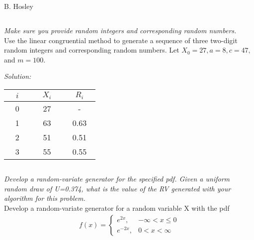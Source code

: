 \documentclass[12pt]{amsart}
\begin{document}
\raggedbottom

\hspace{\fill} {\large B. Hosley}
\bigskip


\setcounter{section}{7}
\setcounter{subsection}{3}
\subsection{} 
	\textit{Make sure you provide random integers and corresponding random numbers.} \\
	Use the linear congruential method to generate a sequence of three two-digit random integers and corresponding random numbers. Let \(X_0 = 27, a = 8, c = 47,\) and \(m = 100\).

\bigskip
	\textit{Solution:} \\ 
	\phantom{text}\hspace{10ex}\phantom{text}
	\begin{tabular}{c|c|c}
		$\quad i\quad$ & $\quad X_i\quad$ & $\quad R_i\quad$ \\
		\midrule
		0 & 27 & - \\
		1 & 63 & 0.63 \\
		2 & 51 & 0.51 \\
		3 & 55 & 0.55 \\
	\end{tabular}
	
\bigskip
	
\setcounter{section}{8}
\setcounter{subsection}{0}
\subsection{} 
	\textit{Develop a random-variate generator for the specified pdf. 
		Given a uniform random draw of U=0.374, what is the value of 
		the RV generated with your algorithm for this problem.} \\
	Develop a random-variate generator for a random variable X with the pdf
	\begin{align*}
		f(x)= \begin{cases}
			e^{2x}, & -\infty<x\leq0 \\
			e^{-2x}, & 0<x<\infty
		\end{cases}
	\end{align*}
	
\end{document}
